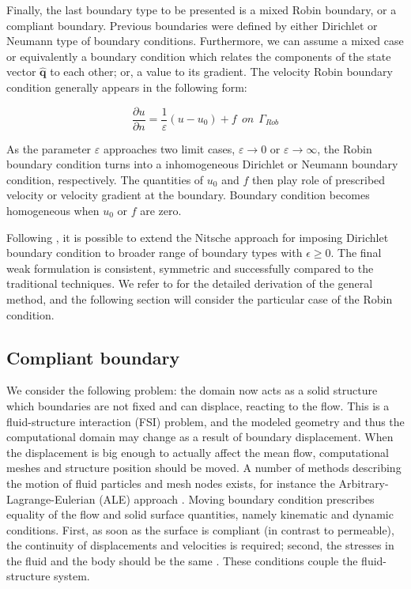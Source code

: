 \begin{itemize}
  Finally, the last boundary type to be presented is a mixed Robin boundary, or a compliant boundary. Previous boundaries were defined by either Dirichlet or Neumann type of boundary conditions. Furthermore, we can assume a mixed case or equivalently a boundary condition which relates the components of the state vector $\hat{\mathbf{q}}$ to each other; or, a value to its gradient. The velocity Robin boundary condition generally appears in the following form:
  
  \begin{equation*}
     \frac{\partial u}{\partial n} = \frac{1}{\varepsilon} (u - u_0) + f \ \ on \ \ \Gamma_{Rob}
  \end{equation*}
  
  As the parameter $\varepsilon$ approaches two limit cases, $\varepsilon \to 0$ or $\varepsilon \to \infty$, the Robin boundary condition turns into a inhomogeneous Dirichlet or Neumann boundary condition, respectively. The quantities of $u_0$ and $f$ then play role of prescribed velocity or velocity gradient at the boundary. Boundary condition becomes homogeneous when $u_0$ or $f$ are zero.
  
  Following \cite{JuntunenS09}, it is possible to extend the Nitsche approach for imposing Dirichlet boundary condition \cite{Nitsche1971} to broader range of boundary types with $\epsilon \ge 0$. The final weak formulation is consistent, symmetric and successfully compared to the traditional techniques. We refer to \cite{JuntunenS09} for the detailed derivation of the general method, and the following section will consider the particular case of the Robin condition.
\end{itemize}  
  
\subsection{Compliant boundary}

We consider the following problem: the domain now acts as a solid structure which boundaries are not fixed and can displace, reacting to the flow. This is a fluid-structure interaction (FSI) problem, and the modeled geometry and thus the computational domain may change as a result of boundary displacement. When the displacement is big enough to actually affect the mean flow, computational meshes and structure position should be moved. A number of methods describing the motion of fluid particles and mesh nodes exists, for instance the Arbitrary-Lagrange-Eulerian (ALE) approach \cite{Donea1982}. Moving boundary condition prescribes equality of the flow and solid surface quantities, namely kinematic and dynamic conditions. First, as soon as the surface is compliant (in contrast to permeable), the continuity of displacements and velocities is required; second, the stresses in the fluid and the body should be the same \cite{Donea2004}. These conditions couple the fluid-structure system.

